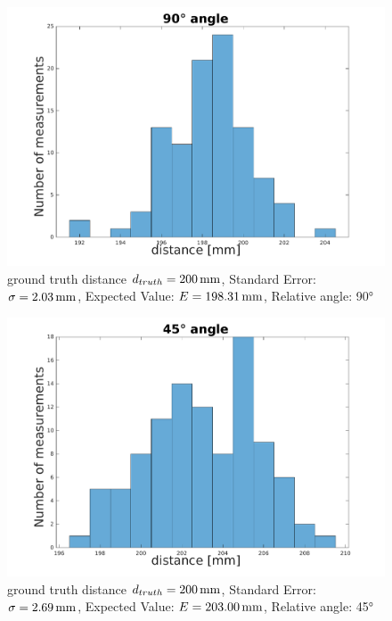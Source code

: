 \begin{figure}
	\centering
	\includegraphics[width=0.9\linewidth]{pictures/plot_angles_90.pdf}
	\caption{ground truth distance $d_{truth}= \unit[200]{mm}$, Standard Error: $\sigma=\unit[2.03]{mm}$, Expected Value: $E=\unit[198.31]{mm}$, Relative angle: 90°}
	\label{fig:angle90}
\end{figure}
\begin{figure}
	\centering
	\includegraphics[width=0.9\linewidth]{pictures/plot_angles_45.pdf}
	\caption{ground truth distance $d_{truth}= \unit[200]{mm}$, Standard Error: $\sigma=\unit[2.69]{mm}$, Expected Value: $E=\unit[203.00]{mm}$, Relative angle: 45°}
	\label{fig:angle45}
\end{figure}
